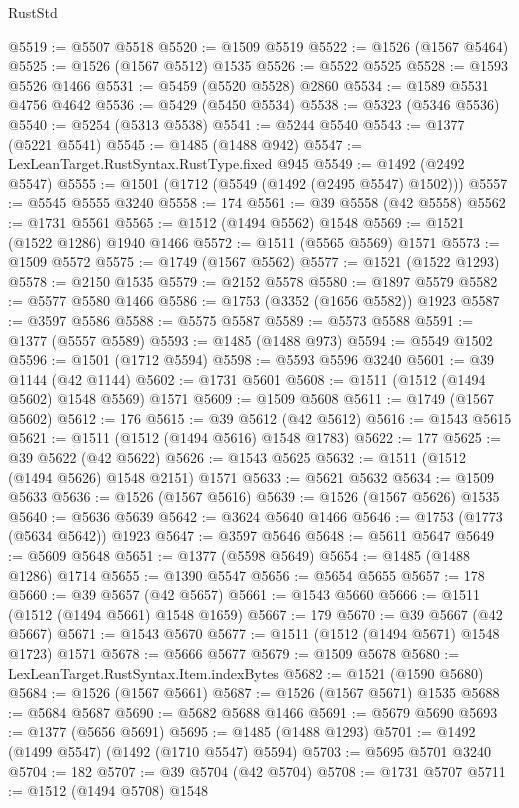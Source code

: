 \begin{lexlean}{RustStd}
\begin{coremodule}
{\begin{coremodule}
{{{{{{{{{{{{{{{{{{{{{{{{{{{{{{{{{{{@5519 := @5507 @5518
@5520 := @1509 @5519
@5522 := @1526 (@1567 @5464)
@5525 := @1526 (@1567 @5512) @1535
@5526 := @5522 @5525
@5528 := @1593 @5526 @1466
@5531 := @5459 (@5520 @5528) @2860
@5534 := @1589 @5531 @4756 @4642
@5536 := @5429 (@5450 @5534)
@5538 := @5323 (@5346 @5536)
@5540 := @5254 (@5313 @5538)
@5541 := @5244 @5540
@5543 := @1377 (@5221 @5541)
@5545 := @1485 (@1488 @942)
@5547 := LexLeanTarget.RustSyntax.RustType.fixed @945
@5549 := @1492 (@2492 @5547)
@5555 := @1501 (@1712 (@5549 (@1492 (@2495 @5547) @1502)))
@5557 := @5545 @5555 @3240
@5558 := 174
@5561 := @39 @5558 (@42 @5558)
@5562 := @1731 @5561
@5565 := @1512 (@1494 @5562) @1548
@5569 := @1521 (@1522 @1286) @1940 @1466
@5572 := @1511 (@5565 @5569) @1571
@5573 := @1509 @5572
@5575 := @1749 (@1567 @5562)
@5577 := @1521 (@1522 @1293)
@5578 := @2150 @1535
@5579 := @2152 @5578
@5580 := @1897 @5579
@5582 := @5577 @5580 @1466
@5586 := @1753 (@3352 (@1656 @5582)) @1923
@5587 := @3597 @5586
@5588 := @5575 @5587
@5589 := @5573 @5588
@5591 := @1377 (@5557 @5589)
@5593 := @1485 (@1488 @973)
@5594 := @5549 @1502
@5596 := @1501 (@1712 @5594)
@5598 := @5593 @5596 @3240
@5601 := @39 @1144 (@42 @1144)
@5602 := @1731 @5601
@5608 := @1511 (@1512 (@1494 @5602) @1548 @5569) @1571
@5609 := @1509 @5608
@5611 := @1749 (@1567 @5602)
@5612 := 176
@5615 := @39 @5612 (@42 @5612)
@5616 := @1543 @5615
@5621 := @1511 (@1512 (@1494 @5616) @1548 @1783)
@5622 := 177
@5625 := @39 @5622 (@42 @5622)
@5626 := @1543 @5625
@5632 := @1511 (@1512 (@1494 @5626) @1548 @2151) @1571
@5633 := @5621 @5632
@5634 := @1509 @5633
@5636 := @1526 (@1567 @5616)
@5639 := @1526 (@1567 @5626) @1535
@5640 := @5636 @5639
@5642 := @3624 @5640 @1466
@5646 := @1753 (@1773 (@5634 @5642)) @1923
@5647 := @3597 @5646
@5648 := @5611 @5647
@5649 := @5609 @5648
@5651 := @1377 (@5598 @5649)
@5654 := @1485 (@1488 @1286) @1714
@5655 := @1390 @5547
@5656 := @5654 @5655
@5657 := 178
@5660 := @39 @5657 (@42 @5657)
@5661 := @1543 @5660
@5666 := @1511 (@1512 (@1494 @5661) @1548 @1659)
@5667 := 179
@5670 := @39 @5667 (@42 @5667)
@5671 := @1543 @5670
@5677 := @1511 (@1512 (@1494 @5671) @1548 @1723) @1571
@5678 := @5666 @5677
@5679 := @1509 @5678
@5680 := LexLeanTarget.RustSyntax.Item.indexBytes
@5682 := @1521 (@1590 @5680)
@5684 := @1526 (@1567 @5661)
@5687 := @1526 (@1567 @5671) @1535
@5688 := @5684 @5687
@5690 := @5682 @5688 @1466
@5691 := @5679 @5690
@5693 := @1377 (@5656 @5691)
@5695 := @1485 (@1488 @1293)
@5701 := @1492 (@1499 @5547) (@1492 (@1710 @5547) @5594)
@5703 := @5695 @5701 @3240
@5704 := 182
@5707 := @39 @5704 (@42 @5704)
@5708 := @1731 @5707
@5711 := @1512 (@1494 @5708) @1548
}}}}}}}}}}}}}}}}}}}}}}}}}}}}}}}}}}}
\end{coremodule}}
\end{coremodule}
\end{lexlean}
